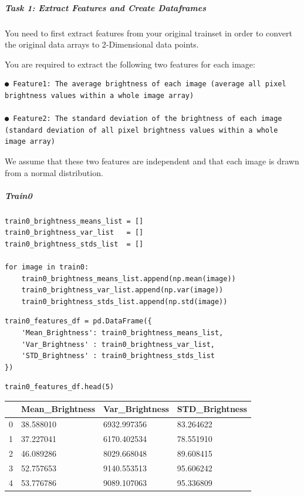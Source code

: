 \subparagraph{Task 1: Extract Features and Create Dataframes}

You need to first extract features from your original trainset in order to convert the original data arrays to 2-Dimensional data points.

You are required to extract the following two features for each image:

\begin{verbatim}
● Feature1: The average brightness of each image (average all pixel brightness values within a whole image array)
                                                  
● Feature2: The standard deviation of the brightness of each image (standard deviation of all pixel brightness values within a whole image array)
\end{verbatim}

We assume that these two features are independent and that each image is drawn from a normal distribution.

\subparagraph{Train0}

\begin{verbatim}
train0_brightness_means_list = []
train0_brightness_var_list   = []
train0_brightness_stds_list  = []

for image in train0:
    train0_brightness_means_list.append(np.mean(image))
    train0_brightness_var_list.append(np.var(image))
    train0_brightness_stds_list.append(np.std(image))
\end{verbatim}

\begin{verbatim}
train0_features_df = pd.DataFrame({
    'Mean_Brightness': train0_brightness_means_list,
    'Var_Brightness' : train0_brightness_var_list,
    'STD_Brightness' : train0_brightness_stds_list
})
\end{verbatim}

\begin{verbatim}
train0_features_df.head(5)
\end{verbatim}

\bigskip\noindent
\begin{tabular}{p{}p{}p{}p{}}
\toprule
 & Mean\_Brightness & Var\_Brightness & STD\_Brightness \\
\hline
0 & 38.588010 & 6932.997356 & 83.264622 \\
\hline
1 & 37.227041 & 6170.402534 & 78.551910 \\
\hline
2 & 46.089286 & 8029.668048 & 89.608415 \\
\hline
3 & 52.757653 & 9140.553513 & 95.606242 \\
\hline
4 & 53.776786 & 9089.107063 & 95.336809 \\
\hline
\bottomrule
\end{tabular}

